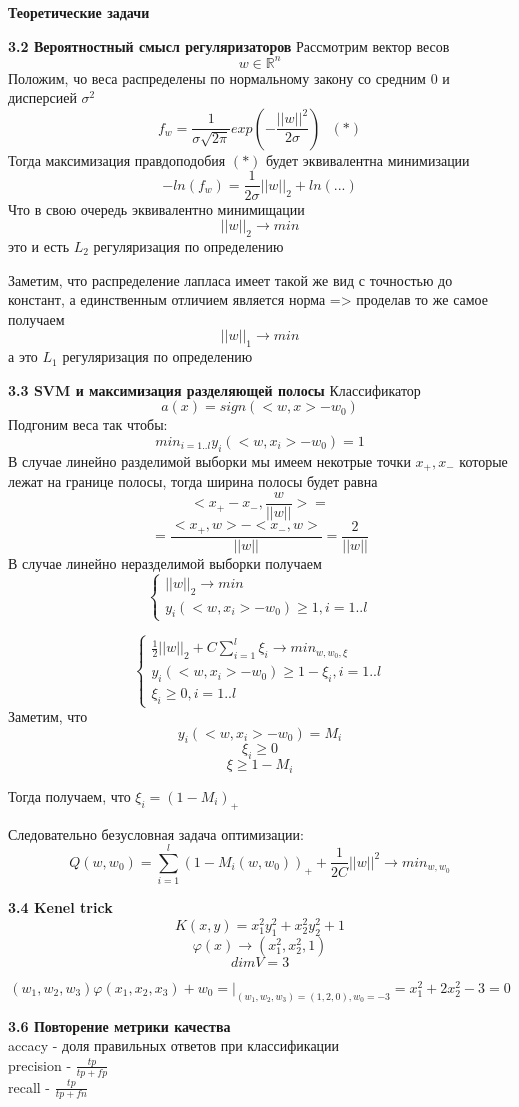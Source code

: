 \documentclass[11pt,a4paper]{article}
\renewcommand{\phi}{\varphi}
\begin{document}
\begin{center}
\Huge {
\noindent
\textbf{Теоретические задачи}
}
\end{center}

\Large {
\textbf {3.2 Вероятностный смысл регуляризаторов}
}
Рассмотрим вектор весов $$ w \in \mathbb{R}^n $$
Положим, чо веса распределены по нормальному закону со средним $0$ и дисперсией $\sigma^2$
 $$ f_w = \frac{1}{\sigma \sqrt{2 \pi}} exp (-\frac{||w||^2}{2\sigma}) \ \ \ (*) $$
Тогда максимизация правдоподобия $(*)$ будет эквивалентна минимизации
$$ -ln (f_w) = \frac{1}{2\sigma} ||w||_2 + ln(...) $$
Что в свою очередь эквивалентно минимищации
$$ ||w||_2 \to min $$
это и есть $L_2$ регуляризация по определению

Заметим, что распределение лапласа имеет такой же вид с точностью до констант, а единственным отличием является норма => проделав то же самое получаем
$$||w||_1 \to min $$
а это $L_1$ регуляризация по определению


\Large {
\textbf {3.3 SVM и максимизация разделяющей полосы}
}
Классификатор
$$ a(x) = sign(<w, x> - w_0) $$
Подгоним веса так чтобы:
$$ min_{i=1..l} y_i (<w, x_i> - w_0) = 1$$
В случае линейно разделимой выборки мы имеем некотрые точки $x_+, x_-$ которые лежат на границе полосы, тогда ширина полосы будет равна
$$ <x_+ - x_-, \frac{w}{||w||}> = $$
$$= \frac{<x_+, w> - <x_-, w>}{||w||} = \frac{2}{||w||}$$
В случае линейно неразделимой выборки получаем
$$
\begin{cases}
||w||_2 \to min\\
y_i (<w, x_i> - w_0) \ge 1, i=1..l
\end{cases}$$

$$
\begin{cases}
\frac{1}{2} ||w||_2 + C \sum_{i=1}^l\xi_i \to min_{w, w_0, \xi} \\
y_i (<w, x_i> - w_0) \ge 1 - \xi_i, i=1..l \\
\xi_i \ge 0, i = 1..l
\end{cases}
$$
Заметим, что
$$ y_i (<w, x_i> - w_0) = M_i $$
$$ \xi_i \ge 0$$
$$\xi \ge 1 - M_i $$

Тогда получаем, что $ \xi_i = (1 - M_i)_+ $

Следовательно безусловная задача оптимизации:
$$ Q(w, w_0) = \sum_{i=1}^l (1 - M_i(w, w_0))_+ + \frac{1}{2C} ||w||^2 \to min_{w, w_0} $$

\Large {
\textbf {3.4 Kenel trick}
}
$$ K(x, y) = x_1^2 y_1^2 + x_2^2 y_2^2 + 1 $$
$$ \phi(x) \to (x_1^2, x_2^2, 1) $$
$$ dim V = 3 $$

$$ (w_1, w_2, w_3) \phi(x_1, x_2, x_3) + w_0 =|_{(w_1, w_2, w_3) = (1, 2, 0), w_0 = -3}  = x_1^2 + 2x_2^2  - 3 = 0$$

\Large {
\textbf {3.6 Повторение метрики качества}
}
\\accacy - доля правильных ответов при классификации
\\precision - $\frac{tp}{tp + fp}$
\\recall - $\frac{tp}{tp + fn}$
\end{document}
